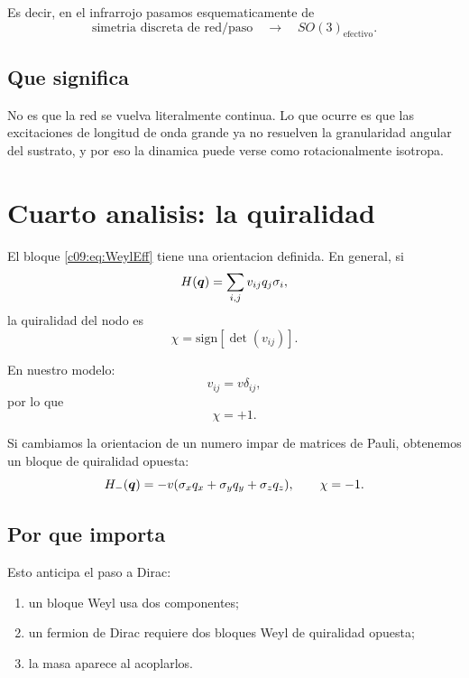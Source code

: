 Es decir, en el infrarrojo pasamos esquematicamente de
\begin{equation}
\text{simetria discreta de red/paso} \quad \longrightarrow \quad SO(3)_{\text{efectivo}}.
\end{equation}

\subsection{Que significa}
No es que la red se vuelva literalmente continua. Lo que ocurre es que las excitaciones de longitud de onda grande ya no resuelven la granularidad angular del sustrato, y por eso la dinamica puede verse como rotacionalmente isotropa.

\section{Cuarto analisis: la quiralidad}
El bloque \eqref{c09:eq:WeylEff} tiene una orientacion definida. En general, si
\begin{equation}
H(\bm{q})=\sum_{i,j} v_{ij} q_j \sigma_i,
\end{equation}
la quiralidad del nodo es
\begin{equation}
\chi = \mathrm{sign}\!\left[\det(v_{ij})\right].
\end{equation}

En nuestro modelo:
\begin{equation}
v_{ij}=v\delta_{ij},
\end{equation}
por lo que
\begin{equation}
\chi=+1.
\end{equation}

Si cambiamos la orientacion de un numero impar de matrices de Pauli, obtenemos un bloque de quiralidad opuesta:
\begin{equation}
H_{-}(\bm{q}) = -v(\sigma_x q_x+\sigma_y q_y+\sigma_z q_z),
\qquad
\chi=-1.
\end{equation}

\subsection{Por que importa}
Esto anticipa el paso a Dirac:
\begin{enumerate}[label=\arabic*.]
    \item un bloque Weyl usa dos componentes;
    \item un fermion de Dirac requiere dos bloques Weyl de quiralidad opuesta;
    \item la masa aparece al acoplarlos.
\end{enumerate}

